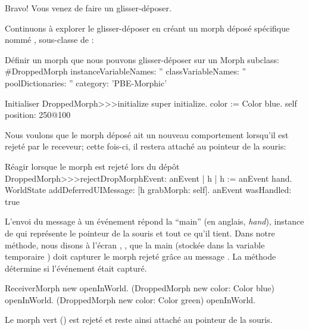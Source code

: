 \documentclass[a4paper,10pt,twoside]{book}
\begin{document}

Bravo! Vous venez de faire un glisser-déposer.

Continuons à explorer le glisser-déposer en créant un morph
déposé spécifique nommé ,
sous-classe de :

\begin{classdef}{Définir un morph que nous pouvons glisser-déposer sur un }
Morph subclass: #DroppedMorph
	instanceVariableNames: ''
	classVariableNames: ''
	poolDictionaries: ''
	category: 'PBE-Morphic'
\end{classdef}

\begin{method}{Initialiser }
DroppedMorph>>>initialize
	super initialize.
	color := Color blue.
	self position: 250@100
\end{method}

Nous voulons que le morph déposé ait un nouveau comportement 
lorsqu'il est rejeté par le receveur; cette fois-ci, il restera
attaché au pointeur de la souris:
\begin{method}{Réagir lorsque le morph est rejeté lors du dépôt}
DroppedMorph>>>rejectDropMorphEvent: anEvent
	| h |
	h := anEvent hand.
	WorldState
		addDeferredUIMessage: [h grabMorph: self].
	anEvent wasHandled: true
\end{method}

L'envoi du message  à un événement
répond la ``main'' (en anglais, \emph{hand}), instance de
 qui représente le pointeur de la souris et tout ce
qu'il tient.
Dans notre méthode, nous disons à l'écran \pharo, , que
la main 
(stockée dans la variable temporaire ) doit capturer
le morph rejeté 
 grâce au message .
La méthode  détermine si l'événement était capturé.

\begin{code}{}
ReceiverMorph new openInWorld.
(DroppedMorph new color: Color blue) openInWorld.
(DroppedMorph new color: Color green) openInWorld.
\end{code}
\noindent
Le morph vert () est rejeté et reste ainsi attaché
au pointeur de la souris.
\end{document}
